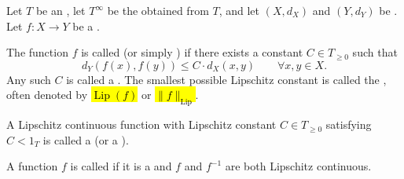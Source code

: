 \begin{definition} \label{definition:lipschitz_continuous_function_between_metric_spaces}
    Let $T$ be an , let $T^\infty$ be the  obtained from $T$, and let $(X, d_X)$ and $(Y, d_Y)$ be . Let $f : X \to Y$ be a .

    The function $f$ is called  (or simply ) if there exists a constant $C \in T_{\ge 0}$ such that
    $$d_Y(f(x), f(y)) \le C \cdot d_X(x, y) \qquad \forall x, y \in X.$$
    Any such $C$ is called a . The smallest possible Lipschitz constant is called the , often denoted by \hl{$\operatorname{Lip}(f)$} or \hl{$\|f\|_{\mathrm{Lip}}$}.

    A Lipschitz continuous function with Lipschitz constant $C \in T_{\ge 0}$ satisfying $C < 1_T$ is called a  (or a ).

    A function $f$ is called  if it is a  and $f$ and $f^{-1}$ are both Lipschitz continuous.
\end{definition}